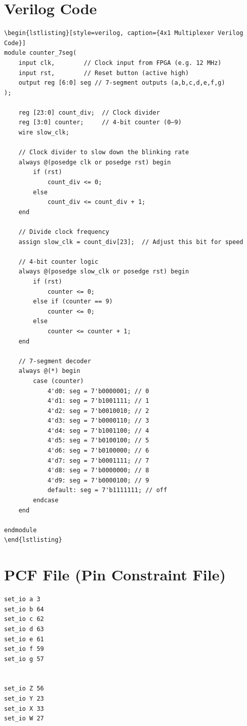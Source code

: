 \documentclass[a4paper,12pt]{article}
\begin{document}
\section*{Verilog Code}
\begin{verbatim}
\begin{lstlisting}[style=verilog, caption={4x1 Multiplexer Verilog Code}]
module counter_7seg(
    input clk,        // Clock input from FPGA (e.g. 12 MHz)
    input rst,        // Reset button (active high)
    output reg [6:0] seg // 7-segment outputs (a,b,c,d,e,f,g)
);

    reg [23:0] count_div;  // Clock divider
    reg [3:0] counter;     // 4-bit counter (0–9)
    wire slow_clk;

    // Clock divider to slow down the blinking rate
    always @(posedge clk or posedge rst) begin
        if (rst)
            count_div <= 0;
        else
            count_div <= count_div + 1;
    end

    // Divide clock frequency
    assign slow_clk = count_div[23];  // Adjust this bit for speed

    // 4-bit counter logic
    always @(posedge slow_clk or posedge rst) begin
        if (rst)
            counter <= 0;
        else if (counter == 9)
            counter <= 0;
        else
            counter <= counter + 1;
    end

    // 7-segment decoder
    always @(*) begin
        case (counter)
            4'd0: seg = 7'b0000001; // 0
            4'd1: seg = 7'b1001111; // 1
            4'd2: seg = 7'b0010010; // 2
            4'd3: seg = 7'b0000110; // 3
            4'd4: seg = 7'b1001100; // 4
            4'd5: seg = 7'b0100100; // 5
            4'd6: seg = 7'b0100000; // 6
            4'd7: seg = 7'b0001111; // 7
            4'd8: seg = 7'b0000000; // 8
            4'd9: seg = 7'b0000100; // 9
            default: seg = 7'b1111111; // off
        endcase
    end

endmodule
\end{lstlisting}
\end{verbatim}

\section*{PCF File (Pin Constraint File)}
\begin{lstlisting}[style=verilog, caption={.pcf File for Vaman Board Pin Mapping}]
set_io a 3
set_io b 64
set_io c 62
set_io d 63
set_io e 61
set_io f 59
set_io g 57


set_io Z 56
set_io Y 23
set_io X 33
set_io W 27
\end{lstlisting}
\end{document}
